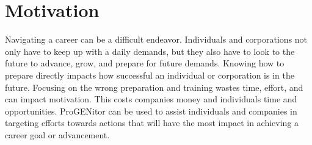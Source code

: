 \section{Motivation}
\label{sect:motivation}
Navigating a career can be a difficult endeavor.  Individuals and corporations
not only have to keep up with a daily demands, but they also have to look to the
future to advance, grow, and prepare for future demands.  Knowing how to prepare
directly impacts how successful an individual or corporation is in the future. 
Focusing on the wrong preparation and training wastes time, effort, and can
impact motivation.  This costs companies money and individuals time and
opportunities.  ProGENitor can be used to assist individuals and companies in
targeting efforts towards actions that will have the most impact in achieving a
career goal or advancement.
